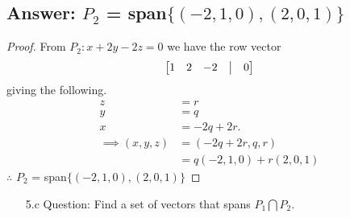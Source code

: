 \documentclass[11pt]{article}
\begin{document}
\subsection{Answer: $P_2$ = span$\{(-2, 1, 0), (2, 0, 1)\}$}
\begin{proof} From $P_2: x + 2y - 2z = 0$ we have the row vector
        \begin{align*}
                \begin{bmatrix}
                        1 & 2 & -2 & \bigm| & 0
                \end{bmatrix}
        \end{align*}
        giving the following.
        \begin{align*}
                z                & =r                         \\
                y                & =q                         \\
                x                & =-2q + 2r.                 \\
                \implies (x,y,z) & = (-2q + 2r, q, r)         \\
                                 & = q(-2, 1, 0) + r(2, 0, 1)
        \end{align*}
        $\therefore$ $P_2$ = span$\{(-2, 1, 0), (2, 0, 1)\}$
\end{proof}
\pagebreak
\begin{enumerate}
        \item[5.c]Question: Find a set of vectors that spans $P_1 \bigcap P_2$.
\end{enumerate}
\end{document}
